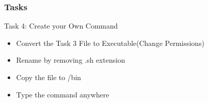 \documentclass{beamer}
\begin{document}
\begin{frame}
  \frametitle{Tasks}
 \begin{block}{ Task 4: Create your Own Command}
  
  \begin{itemize}
    \item Convert the Task 3 File to Executable(Change Permissions)
    \item Rename by removing .sh extension
    \item Copy the file to /bin
    \item Type the command anywhere
  \end{itemize}
  \end{block}
\end{frame}
\end{document}
